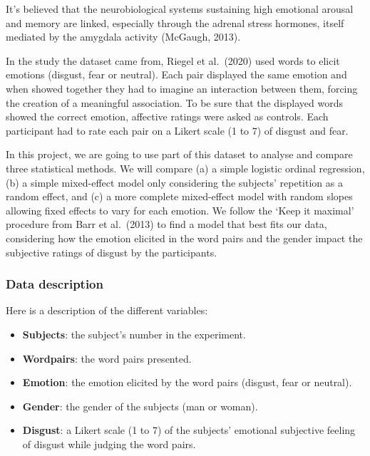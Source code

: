 \documentclass[
]{article}
\begin{document}
It's believed that the neurobiological systems sustaining high emotional
arousal and memory are linked, especially through the adrenal stress
hormones, itself mediated by the amygdala activity (McGaugh, 2013).

In the study the dataset came from, Riegel et al.~(2020) used words to
elicit emotions (disgust, fear or neutral). Each pair displayed the same
emotion and when showed together they had to imagine an interaction
between them, forcing the creation of a meaningful association. To be
sure that the displayed words showed the correct emotion, affective
ratings were asked as controls. Each participant had to rate each pair
on a Likert scale (1 to 7) of disgust and fear.

In this project, we are going to use part of this dataset to analyse and
compare three statistical methods. We will compare (a) a simple logistic
ordinal regression, (b) a simple mixed-effect model only considering the
subjects' repetition as a random effect, and (c) a more complete
mixed-effect model with random slopes allowing fixed effects to vary for
each emotion. We follow the `Keep it maximal' procedure from Barr et
al.~(2013) to find a model that best fits our data, considering how the
emotion elicited in the word pairs and the gender impact the subjective
ratings of disgust by the participants.

\hypertarget{data-description}{%
\subsubsection{Data description}\label{data-description}}

Here is a description of the different variables:

\begin{itemize}
\item
  \textbf{Subjects}: the subject's number in the experiment.
\item
  \textbf{Wordpairs}: the word pairs presented.
\item
  \textbf{Emotion}: the emotion elicited by the word pairs (disgust,
  fear or neutral).
\item
  \textbf{Gender}: the gender of the subjects (man or woman).
\item
  \textbf{Disgust}: a Likert scale (1 to 7) of the subjects' emotional
  subjective feeling of disgust while judging the word pairs.
\end{itemize}
\end{document}
